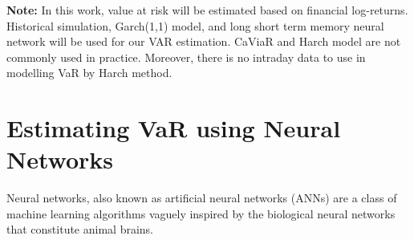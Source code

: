 \documentclass[a4paper,11pt,oneside]{book}
\begin{document}
\newline\newline
\textbf{Note:} In this work, value at risk will be estimated based on financial log-returns. Historical simulation, Garch(1,1) model, and long short term memory neural network will be used for our VAR estimation. CaViaR and Harch model are not commonly used in practice. Moreover, there is no intraday data to use in modelling VaR by Harch method.

\chapter{Estimating VaR using Neural Networks
}
Neural networks, also known as artificial neural networks (ANNs) are a class of machine learning algorithms vaguely inspired by the biological neural networks that constitute animal brains.\newline\newline
\end{document}
